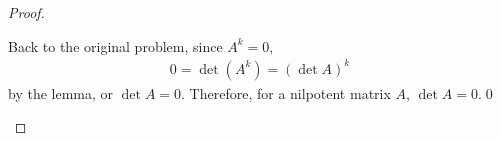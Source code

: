 \begin{proof}
\begin{enumerate}[(i)]
        Back to the original problem, since $A^k=0$, 
        \[
            \begin{aligned}
                0=\det(A^k)=(\det A)^k
            \end{aligned}
        \]
        by the lemma, or $\det A=0$. Therefore, for a nilpotent matrix $A$, $\det A=0$.\qed
    \end{enumerate}
    
    \renewcommand{\qedsymbol}{}
\end{proof}

